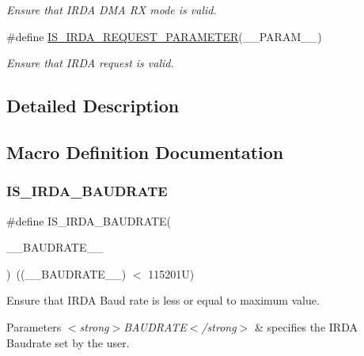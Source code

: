 \begin{DoxyCompactItemize}
\begin{DoxyCompactList}\small\item\em Ensure that I\+R\+DA D\+MA RX mode is valid. \end{DoxyCompactList}\item 
\#define \hyperlink{group___i_r_d_a___private___macros_gad9d643360bbb8c35f04c9aeefa5bb1d5}{I\+S\+\_\+\+I\+R\+D\+A\+\_\+\+R\+E\+Q\+U\+E\+S\+T\+\_\+\+P\+A\+R\+A\+M\+E\+T\+ER}(\+\_\+\+\_\+\+P\+A\+R\+A\+M\+\_\+\+\_\+)
\begin{DoxyCompactList}\small\item\em Ensure that I\+R\+DA request is valid. \end{DoxyCompactList}\end{DoxyCompactItemize}


\subsection{Detailed Description}


\subsection{Macro Definition Documentation}
\mbox{\label{group___i_r_d_a___private___macros_gac2fec9bcc7ccdd8ccdd7ab75246860d5}} 
\subsubsection{\texorpdfstring{I\+S\+\_\+\+I\+R\+D\+A\+\_\+\+B\+A\+U\+D\+R\+A\+TE}{IS\_IRDA\_BAUDRATE}}
{\footnotesize\ttfamily \#define I\+S\+\_\+\+I\+R\+D\+A\+\_\+\+B\+A\+U\+D\+R\+A\+TE(\begin{DoxyParamCaption}\item[{}]{\+\_\+\+\_\+\+B\+A\+U\+D\+R\+A\+T\+E\+\_\+\+\_\+ }\end{DoxyParamCaption})~((\+\_\+\+\_\+\+B\+A\+U\+D\+R\+A\+T\+E\+\_\+\+\_\+) $<$ 115201\+U)}



Ensure that I\+R\+DA Baud rate is less or equal to maximum value. 


\begin{DoxyParams}{Parameters}
{\em $<$strong$>$\+B\+A\+U\+D\+R\+A\+T\+E$<$/strong$>$} & specifies the I\+R\+DA Baudrate set by the user. \\
\hline
\end{DoxyParams}

